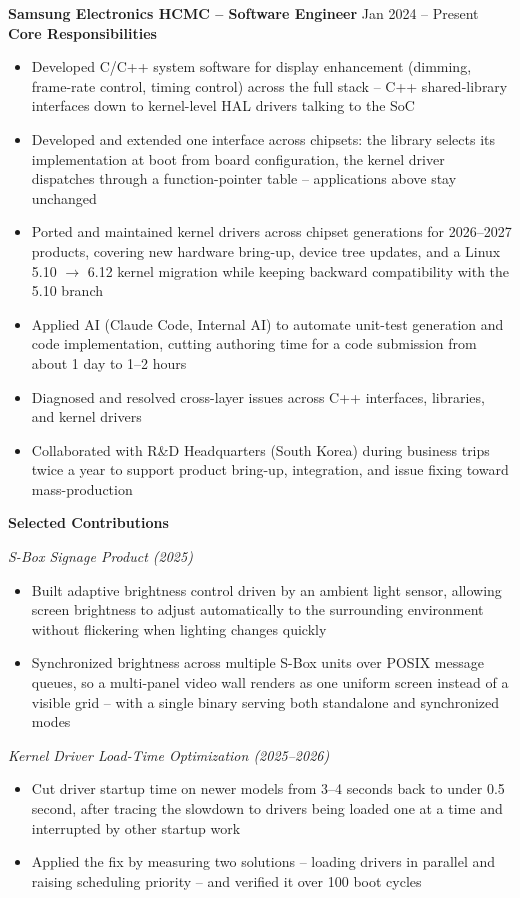 \documentclass[a4paper,10pt]{article}
\newcommand{\project}[1]{\vspace{2pt}\textit{#1}\vspace{1pt}}
\begin{document}
\textbf{Samsung Electronics HCMC -- Software Engineer} \hfill Jan 2024 -- Present \\[2pt]
\textbf{Core Responsibilities}
\begin{itemize}
\item Developed C/C++ system software for display enhancement (dimming, frame-rate control,
      timing control) across the full stack -- C++ shared-library interfaces down to
      kernel-level HAL drivers talking to the SoC
\item Developed and extended one interface across chipsets: the library
      selects its implementation at boot from board configuration, the kernel driver
      dispatches through a function-pointer table -- applications above stay unchanged
\item Ported and maintained kernel drivers across chipset generations for 2026--2027 products, covering new hardware bring-up, device tree updates, and a Linux 5.10 $\rightarrow$ 6.12 kernel migration while keeping backward compatibility with the 5.10 branch
\item Applied AI (Claude Code, Internal AI) to automate unit-test generation and code implementation, cutting authoring time for a code submission from about 1 day to 1--2 hours
\item Diagnosed and resolved cross-layer issues across C++ interfaces, libraries, and kernel drivers
\item Collaborated with R\&D Headquarters (South Korea) during business trips twice a year to support product bring-up, integration, and issue fixing toward mass-production
\end{itemize}

\vspace{2pt}
\textbf{Selected Contributions}

\project{S-Box Signage Product (2025)}
\begin{itemize}
    \item Built adaptive brightness control driven by an ambient light sensor, allowing screen
      brightness to adjust automatically to the surrounding environment without flickering
      when lighting changes quickly
    \item Synchronized brightness across multiple S-Box units over POSIX message queues, so a multi-panel video wall renders as one uniform screen instead of a visible grid -- with a single binary serving both standalone and synchronized modes
\end{itemize}

\project{Kernel Driver Load-Time Optimization (2025--2026)}
\begin{itemize}
    \item Cut driver startup time on newer models from 3--4 seconds back to under
          0.5 second, after tracing the slowdown to drivers being loaded one at a time
          and interrupted by other startup work
    \item Applied the fix by measuring two solutions -- loading drivers in parallel and
          raising scheduling priority -- and verified it over 100 boot cycles
\end{itemize}
\end{document}
